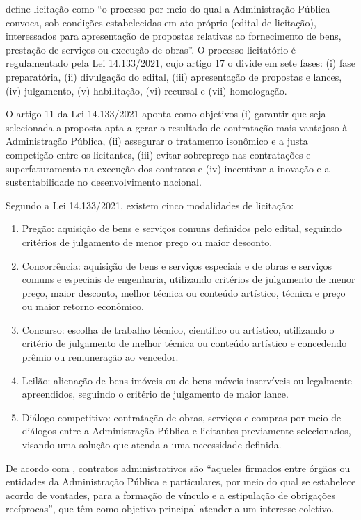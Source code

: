\documentclass[
	12pt,				%
	oneside,			%
	a4paper,			%
	chapter=TITLE,		%
	section=TITLE,		%
	english,			%
	brazil				%
	]{abntex2}
\begin{document}
\cite{tcu2023} define licitação como “o processo por meio do qual a Administração Pública convoca, sob condições estabelecidas em ato próprio (edital de licitação), interessados para apresentação de propostas relativas ao fornecimento de bens, prestação de serviços ou execução de obras”. O processo licitatório é regulamentado pela Lei 14.133/2021, cujo artigo 17 o divide em sete fases: (i) fase preparatória, (ii) divulgação do edital, (iii) apresentação de propostas e lances, (iv) julgamento, (v) habilitação, (vi) recursal e (vii) homologação.

O artigo 11 da Lei 14.133/2021 aponta como objetivos (i) garantir que seja selecionada a proposta apta a gerar o resultado de contratação mais vantajoso à Administração Pública, (ii) assegurar o tratamento isonômico e a justa competição entre os licitantes, (iii) evitar sobrepreço nas contratações e superfaturamento na execução dos contratos e (iv) incentivar a inovação e a sustentabilidade no desenvolvimento nacional.

Segundo a Lei 14.133/2021, existem cinco modalidades de licitação:
\begin{enumerate}
    \item Pregão: aquisição de bens e serviços comuns definidos pelo edital, seguindo critérios de julgamento de menor preço ou maior desconto.
    \item Concorrência: aquisição de bens e serviços especiais e de obras e serviços comuns e especiais de engenharia, utilizando critérios de julgamento de menor preço, maior desconto, melhor técnica ou conteúdo artístico, técnica e preço ou maior retorno econômico.
    \item Concurso: escolha de trabalho técnico, científico ou artístico, utilizando o critério de julgamento de melhor técnica ou conteúdo artístico e concedendo prêmio ou remuneração ao vencedor.
    \item Leilão: alienação de bens imóveis ou de bens móveis inservíveis ou legalmente apreendidos, seguindo o critério de julgamento de maior lance.
    \item Diálogo competitivo: contratação de obras, serviços e compras por meio de diálogos entre a Administração Pública e licitantes previamente selecionados, visando uma solução que atenda a uma necessidade definida.
\end{enumerate}

De acordo com \cite{tcu2023}, contratos administrativos são “aqueles firmados entre órgãos ou entidades da Administração Pública e particulares, por meio do qual se estabelece acordo de vontades, para a formação de vínculo e a estipulação de obrigações recíprocas”, que têm como objetivo principal atender a um interesse coletivo.
\end{document}
